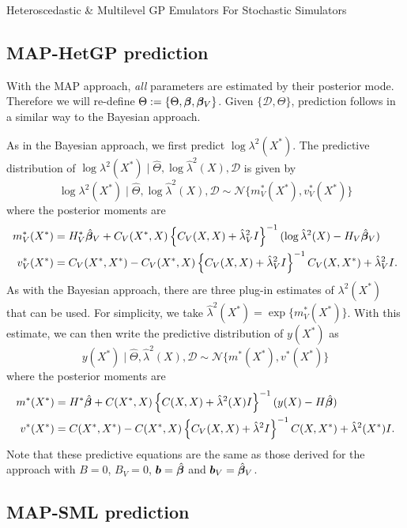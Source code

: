 \begin{chapter}{Heteroscedastic \& Multilevel GP Emulators For Stochastic Simulators\label{Ch:Hetsml}}
\subsection{MAP-HetGP prediction}

With the MAP approach, \emph{all} parameters are estimated by their posterior mode. Therefore we will re-define $\Theta := \{\Theta, \bm{\beta}, \bm{\beta}_V \}$. Given $\{\mathcal{D}, \Theta \}$, prediction follows in a similar way to the Bayesian approach.

As in the Bayesian approach, we first predict $\log \lambda^2 (X^*)$. The predictive distribution of $\log \lambda^2 (X^*) \mid \widehat{\Theta}, \log \hat{\lambda}^2(X), \mathcal{D}$ is given by
\begin{equation}
	\log \lambda^2 (X^*) \mid \widehat{\Theta}, \log \hat{\lambda}^2(X), \mathcal{D} \sim \mathcal{N} \{ m_V^*(X^*), v_V^*(X^*) \}
\end{equation}
where the posterior moments are
\begin{align}
	m_V^*(X^*) &= H_V^* \hat{\bm{\beta}}_V + C_V(X^*, X)\left\{ C_V(X, X) + \hat{\lambda}^2_V I \right\}^{-1} ( \log \hat{\lambda}^2 (X) - H_V \hat{\bm{\beta}}_V ) \\
	v_V^*(X^*) &= C_V(X^*, X^*) - C_V(X^*, X)\left\{ C_V(X, X) + \hat{\lambda}^2_V I \right\}^{-1} C_V(X, X^*) + \hat{\lambda}^2_V I.
\end{align}
As with the Bayesian approach, there are three plug-in estimates of $\lambda^2(X^*)$ that can be used. For simplicity, we take $\hat{\lambda}^2(X^*) = \exp\{ m_V^*(X^*) \}$. With this estimate, we can then write the predictive distribution of $y(X^*)$ as
\begin{equation}
	y(X^*) \mid \hat{\Theta},\hat{\lambda}^2(X), \mathcal{D} \sim \mathcal{N} \{ m^*(X^*), v^*(X^*) \}
\end{equation}
where the posterior moments are
\begin{align}
	m^*(X^*) &= H^* \hat{\bm{\beta}} + C(X^*, X)\left\{ C(X, X) + \hat{\lambda}^2(X) I \right\}^{-1} ( y(X) - H \hat{\bm{\beta}} ) \\
	v^*(X^*) &= C(X^*, X^*) - C(X^*, X)\left\{ C_V(X, X) + \hat{\lambda}^2 I \right\}^{-1} C(X, X^*) + \hat{\lambda}^2(X^*) I.
\end{align}
Note that these predictive equations are the same as those derived for the  approach with $B = 0$, $B_V = 0$, $\bm{b} = \hat{\bm{\beta}}$ and $\bm{b}_V = \hat{\bm{\beta}}_V$.
\subsection{MAP-SML prediction}


\end{chapter}
